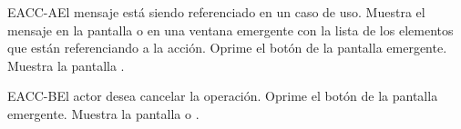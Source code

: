 	\begin{UCtrayectoriaA}{EACC-A}{El mensaje está siendo referenciado en un caso de uso.}
		\UCpaso[\UCsist] Muestra el mensaje  en la pantalla  o  en una ventana emergente con la lista de los elementos que están referenciando a la acción.
		\UCpaso[\UCactor] Oprime el botón  de la pantalla emergente.
		\UCpaso[\UCsist] Muestra la pantalla .
	\end{UCtrayectoriaA}

	\begin{UCtrayectoriaA}{EACC-B}{El actor desea cancelar la operación.}
		\UCpaso[\UCactor] Oprime el botón  de la pantalla emergente.
		\UCpaso[\UCsist] Muestra la pantalla  o .
	\end{UCtrayectoriaA}
	

